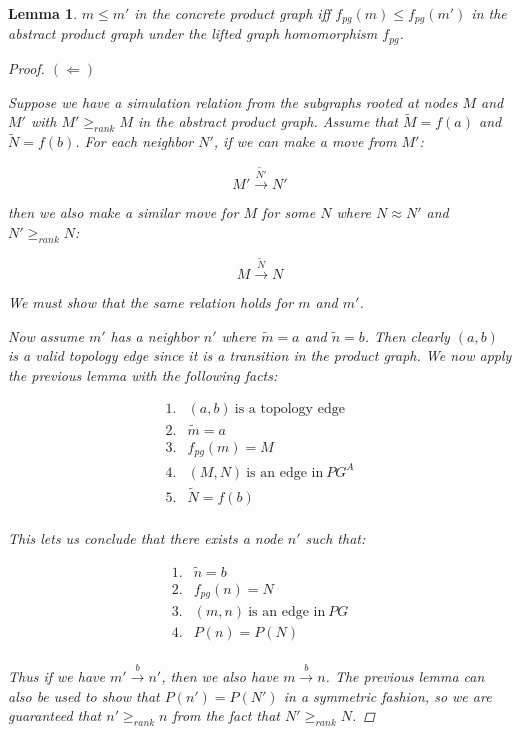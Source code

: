 \documentclass[twocolumn, openany]{sig-alternate-10pt}
\newtheorem{lem}[thm]{Lemma}
\begin{document}
\begin{lem}
  $m \leq m'$ in the concrete product graph iff $f_{pg}(m) \leq f_{pg}(m')$ in the abstract product graph under the lifted graph homomorphism $f_{pg}$.

  \begin{proof}
    $(\Leftarrow)$

    Suppose we have a simulation relation from the subgraphs rooted at nodes $M$ and $M'$ with $M' \geq_{rank} M$ in the abstract product graph. Assume that $\tilde{M} = f(a)$ and $\tilde{N} = f(b)$. For each neighbor $N'$, if we can make a move from $M'$:

    $$M' \overset{\tilde{N'}}{\rightarrow} N'$$

    then we also make a similar move for $M$ for some $N$ where $N \approx N'$ and $N' \geq_{rank} N$:

    $$M \overset{\tilde{N}}{\rightarrow} N$$

    We must show that the same relation holds for $m$ and $m'$. 

    Now assume $m'$ has a neighbor $n'$ where $\tilde{m} = a$ and $\tilde{n} = b$. Then clearly $(a,b)$ is a valid topology edge since it is a transition in the product graph. We now apply the previous lemma with the following facts:

    \[ \begin{array}{ll}
      1. & (a,b) ~\text{is a topology edge} \\
      2. & \tilde{m} = a \\
      3. & f_{pg}(m) = M \\
      4. & (M,N) ~\text{is an edge in}~ PG^A \\
      5. & \tilde{N} = f(b) \\
    \end{array} \]

    This lets us conclude that there exists a node $n'$ such that:

    \[ \begin{array}{ll}
      1. & \tilde{n} = b \\
      2. & f_{pg}(n) = N \\
      3. & (m,n) ~\text{is an edge in}~ PG \\
      4. & P(n) = P(N) \\
    \end{array} \] 

    Thus if we have $m' \overset{b}{\rightarrow} n'$, then we also have $m \overset{b}{\rightarrow} n$. The previous lemma can also be used to show that $P(n') = P(N')$ in a symmetric fashion, so we are guaranteed that $n' \geq_{rank} n$ from the fact that $N' \geq_{rank} N$.


\end{proof}
\end{lem}
\end{document}
